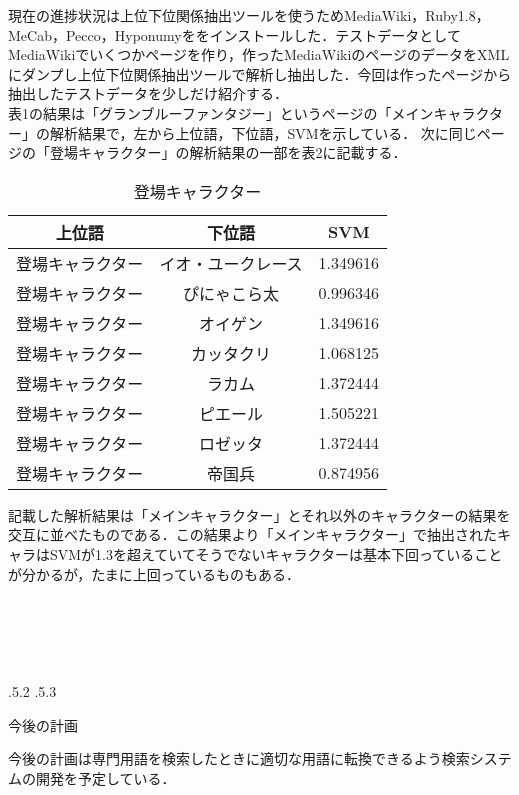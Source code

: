 \documentclass[uplatex]{jsarticle}
\makeatletter
\renewcommand{\section}{%
    \if@slide\clearpage\fi
    \@startsection{section}{1}{\z@}%
    {\Cvs \@plus.5\Cdp \@minus.2\Cdp}%
    {.5\Cvs \@plus.3\Cdp}%
    {\normalfont\raggedright}}
\makeatother
\begin{document}
現在の進捗状況は上位下位関係抽出ツールを使うためMediaWiki，Ruby1.8，MeCab，Pecco，Hyponumyををインストールした．テストデータとしてMediaWikiでいくつかページを作り，作ったMediaWikiのページのデータをXMLにダンプし上位下位関係抽出ツールで解析し抽出した．今回は作ったページから抽出したテストデータを少しだけ紹介する．\\



表1の結果は「グランブルーファンタジー」というページの「メインキャラクター」の解析結果で，左から上位語，下位語，SVMを示している．
次に同じページの「登場キャラクター」の解析結果の一部を表2に記載する．

\begin{wraptable}[10]{r}[1cm]{8cm}
\vspace*{-\intextsep}
\caption{登場キャラクター}\label{サンプル表}
\begin{tabular}{ccc}\hline
上位語 & 下位語 & SVM \\
\hline
{登場キャラクター} & イオ・ユークレース & 1.349616\\
{登場キャラクター} & ぴにゃこら太 & 0.996346\\
{登場キャラクター} &オイゲン & 1.349616\\
{登場キャラクター} & カッタクリ & 1.068125\\
{登場キャラクター} & ラカム & 1.372444\\
{登場キャラクター} & ピエール &1.505221\\
{登場キャラクター} & ロゼッタ & 1.372444\\
{登場キャラクター} & 帝国兵& 0.874956\\\hline
\end{tabular}
\end{wraptable}

記載した解析結果は「メインキャラクター」とそれ以外のキャラクターの結果を交互に並べたものである．この結果より「メインキャラクター」で抽出されたキャラはSVMが1.3を超えていてそうでないキャラクターは基本下回っていることが分かるが，たまに上回っているものもある．\\
\\
\\
\\
\\
\\


\section{今後の計画}


今後の計画は専門用語を検索したときに適切な用語に転換できるよう検索システムの開発を予定している．



\end{document}
